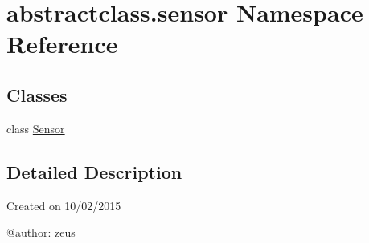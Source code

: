 \hypertarget{namespaceabstractclass_1_1sensor}{}\section{abstractclass.\+sensor Namespace Reference}
\label{namespaceabstractclass_1_1sensor}
\subsection*{Classes}
\begin{DoxyCompactItemize}
\item 
class \hyperlink{classabstractclass_1_1sensor_1_1Sensor}{Sensor}
\end{DoxyCompactItemize}


\subsection{Detailed Description}
\begin{DoxyVerb}Created on 10/02/2015

@author: zeus
\end{DoxyVerb}
 